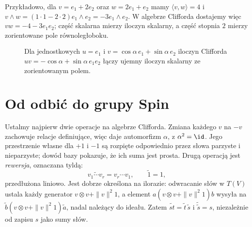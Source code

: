 Przykładowo, dla $v=e_1+2e_2$ oraz $w=2e_1+e_2$
mamy $\langle v,w\rangle=4$ i
$v\wedge w=(1\cdot1-2\cdot2)e_1\wedge e_2
=-3e_1\wedge e_2$. W algebrze Clifforda dostajemy
więc $vw=-4-3e_1e_2$; część skalarna mierzy
iloczyn skalarny, a część stopnia $2$ mierzy
zorientowane pole równoległoboku.

\begin{figure}[!htbp]
\centering
{}
\caption{Dla jednostkowych $u=e_1$ i
$v=\cos\alpha\,e_1+\sin\alpha\,e_2$ iloczyn Clifforda
$uv=-\cos\alpha+\sin\alpha\,e_1e_2$ łączy
ujemny iloczyn skalarny ze zorientowanym polem.}
\label{fig:cliff-iloczyn}
\end{figure}

\section{Od odbić do grupy Spin}
\label{sec:spin-grupa}

Ustalmy najpierw dwie operacje na algebrze Clifforda.
Zmiana każdego $v$ na $-v$ zachowuje relacje definiujące,
więc daje automorfizm $\alpha$, z $\alpha^2=\id$.
Jego przestrzenie własne dla $+1$ i $-1$ są rozpięte
odpowiednio przez słowa parzyste i nieparzyste; dowód bazy
pokazuje, że ich suma jest prosta.
Drugą operacją jest \emph{rewersja}, oznaczana tyldą:
\[
 \widetilde{v_1\cdots v_r}=v_r\cdots v_1,\qquad
 \widetilde 1=1,
\]
przedłużona liniowo. Jest dobrze określona na ilorazie:
odwracanie słów w $T(V)$ ustala każdy generator
$v\otimes v+\|v\|^2 1$, a element $a(v\otimes v+\|v\|^2 1)b$
wysyła na $\widetilde b(v\otimes v+\|v\|^2 1)\widetilde a$,
nadal należący do ideału. Zatem
$\widetilde{st}=\widetilde t\,\widetilde s$ i
$\widetilde{\widetilde s}=s$, niezależnie od zapisu $s$ jako sumy słów.

